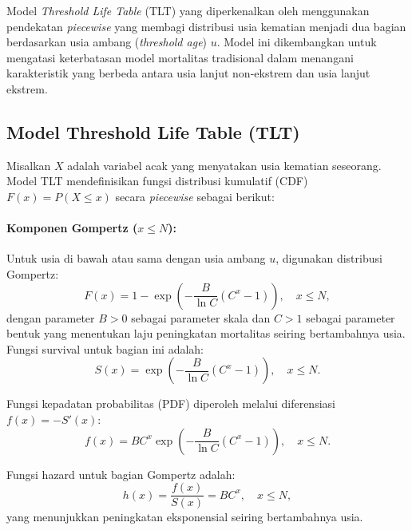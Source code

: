 Model \textit{Threshold Life Table} (TLT) yang diperkenalkan oleh \citet{li2008threshold} menggunakan pendekatan \textit{piecewise} yang membagi distribusi usia kematian menjadi dua bagian berdasarkan usia ambang (\textit{threshold age}) $u$. Model ini dikembangkan untuk mengatasi keterbatasan model mortalitas tradisional dalam menangani karakteristik yang berbeda antara usia lanjut non-ekstrem dan usia lanjut ekstrem.

\subsection{Model Threshold Life Table (TLT)}

Misalkan $X$ adalah variabel acak yang menyatakan usia kematian seseorang. Model TLT mendefinisikan fungsi distribusi kumulatif (CDF) $F(x) = P(X \leq x)$ secara \textit{piecewise} sebagai berikut:

\paragraph{Komponen Gompertz ($x \leq N$):}
Untuk usia di bawah atau sama dengan usia ambang $u$, digunakan distribusi Gompertz:
\begin{equation}
F(x) = 1 - \exp\left(-\frac{B}{\ln C}(C^x - 1)\right), \quad x \leq N,
\label{eq:tlt_gompertz_cdf}
\end{equation}
dengan parameter $B > 0$ sebagai parameter skala dan $C > 1$ sebagai parameter bentuk yang menentukan laju peningkatan mortalitas seiring bertambahnya usia. Fungsi survival untuk bagian ini adalah:
\begin{equation}
S(x) = \exp\left(-\frac{B}{\ln C}(C^x - 1)\right), \quad x \leq N.
\label{eq:tlt_gompertz_survival}
\end{equation}

Fungsi kepadatan probabilitas (PDF) diperoleh melalui diferensiasi $f(x) = -S'(x)$:
\begin{equation}
f(x) = BC^x \exp\left(-\frac{B}{\ln C}(C^x - 1)\right), \quad x \leq N.
\label{eq:tlt_gompertz_pdf}
\end{equation}

Fungsi hazard untuk bagian Gompertz adalah:
\begin{equation}
h(x) = \frac{f(x)}{S(x)} = BC^x, \quad x \leq N,
\label{eq:tlt_gompertz_hazard}
\end{equation}
yang menunjukkan peningkatan eksponensial seiring bertambahnya usia.

